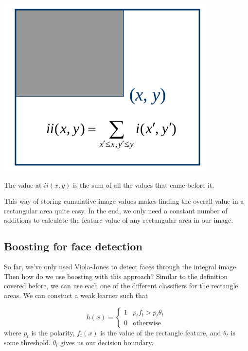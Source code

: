 \documentclass{tufte-handout}
\begin{document}
\begin{marginfigure}
		\includegraphics[scale=0.3]{integral}
		\caption{The value at $ii(x, y)$ is the sum of all the values that came before it.}
\end{marginfigure}

This way of storing cumulative image values makes finding the overall value in a rectangular area quite easy. 
In the end, we only need a constant number of additions to calculate the feature value of any rectangular 
area in our image.

\subsection{Boosting for face detection}
So far, we've only used Viola-Jones to detect faces through the integral image. Then how do we use boosting
with this approach? Similar to the definition covered before, we can use each one of the different classifiers
for the rectangle areas. We can constuct a weak learner such that 

\[h(x) =  
	\begin{cases}
			1 & p_{t}f_{t} > p_{t}\theta_{t} \\
			0 & \textrm{otherwise}
	\end{cases}
\]
where $p_{t}$ is the polarity, $f_{t}(x)$ is the value of the rectangle feature, and $\theta_{t}$ is some
threshold. $\theta_{t}$ gives us our decision boundary. 
\end{document}

